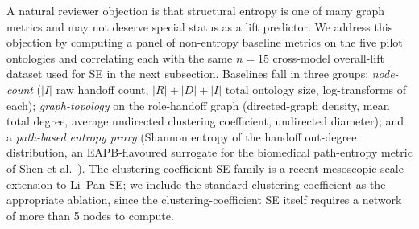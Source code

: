 \documentclass[11pt,a4paper]{article}
\begin{document}
A natural reviewer objection is that structural entropy is one of many
graph metrics and may not deserve special status as a lift predictor.
We address this objection by computing a panel of non-entropy
baseline metrics on the five pilot ontologies and correlating each
with the same $n = 15$ cross-model overall-lift dataset used for SE
in the next subsection. Baselines fall in three groups:
\emph{node-count} ($|I|$ raw handoff count, $|R|+|D|+|I|$ total
ontology size, log-transforms of each); \emph{graph-topology} on the
role-handoff graph (directed-graph density, mean total degree,
average undirected clustering coefficient, undirected diameter); and
a \emph{path-based entropy proxy} (Shannon entropy of the handoff
out-degree distribution, an EAPB-flavoured surrogate for the
biomedical path-entropy metric of Shen et al.\ \citep{shen2018eapb}).
The clustering-coefficient SE family
\citep{zhang2024clustering} is a recent mesoscopic-scale extension
to Li--Pan SE; we include the standard clustering coefficient as
the appropriate ablation, since the clustering-coefficient SE
itself requires a network of more than 5 nodes to compute.
\end{document}
